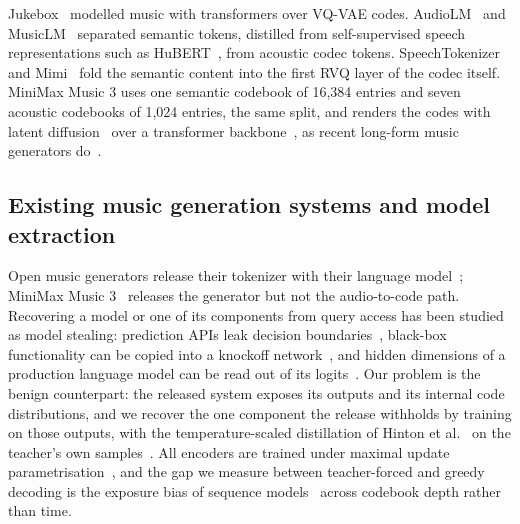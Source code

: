 Jukebox~\cite{dhariwal2020jukebox} modelled music with transformers over VQ-VAE codes. AudioLM~\cite{borsos2023audiolm} and MusicLM~\cite{agostinelli2023musiclm} separated semantic tokens, distilled from self-supervised speech representations such as HuBERT~\cite{hsu2021hubert}, from acoustic codec tokens. SpeechTokenizer~\cite{zhang2024speechtokenizer} and Mimi~\cite{defossez2024moshi} fold the semantic content into the first RVQ layer of the codec itself. MiniMax Music 3 uses one semantic codebook of 16,384 entries and seven acoustic codebooks of 1,024 entries, the same split, and renders the codes with latent diffusion~\cite{ho2020ddpm,lipman2023flow} over a transformer backbone~\cite{peebles2023dit,esser2024sd3}, as recent long-form music generators do~\cite{evans2024longform}.

\subsection{Existing music generation systems and model extraction}

Open music generators release their tokenizer with their language model~\cite{copet2023musicgen,agostinelli2023musiclm}; MiniMax Music 3~\cite{minimax2026music3} releases the generator but not the audio-to-code path. Recovering a model or one of its components from query access has been studied as model stealing: prediction APIs leak decision boundaries~\cite{tramer2016stealing}, black-box functionality can be copied into a knockoff network~\cite{orekondy2019knockoff}, and hidden dimensions of a production language model can be read out of its logits~\cite{carlini2024stealing}. Our problem is the benign counterpart: the released system exposes its outputs and its internal code distributions, and we recover the one component the release withholds by training on those outputs, with the temperature-scaled distillation of Hinton et al.~\cite{hinton2015distill} on the teacher's own samples~\cite{kim2016sequence,beyer2022patient}. All encoders are trained under maximal update parametrisation~\cite{yang2022mup}, and the gap we measure between teacher-forced and greedy decoding is the exposure bias of sequence models~\cite{bengio2015scheduled,ranzato2016sequence} across codebook depth rather than time.
